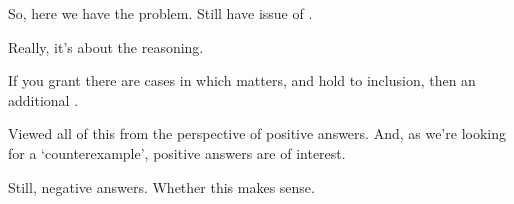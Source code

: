 \begin{note}
  So, here we have the problem.
  Still have issue of \requ{}.

  Really, it's about the reasoning.

  If you grant there are cases in which \qzS{} matters, and hold to inclusion, then an additional \requ{}.
\end{note}

\begin{note}
  Viewed all of this from the perspective of positive answers.
  And, as we're looking for a `counterexample', positive answers are of interest.

  Still, negative answers.
  Whether this makes sense.
\end{note}


